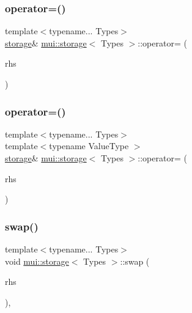\subsubsection{\texorpdfstring{operator=()}{operator=()}\hspace{0.1cm}{\footnotesize\ttfamily [1/2]}}
{\footnotesize\ttfamily template$<$typename... Types$>$ \\
\hyperlink{structmui_1_1storage}{storage}\& \hyperlink{structmui_1_1storage}{mui\+::storage}$<$ Types $>$\+::operator= (\begin{DoxyParamCaption}\item[{\hyperlink{structmui_1_1storage}{storage}$<$ Types $>$}]{rhs }\end{DoxyParamCaption})\hspace{0.3cm}{\ttfamily [inline]}}

\mbox{\label{structmui_1_1storage_a1c9113c4d41c9be4ed22ccd4e0819211}} 
\subsubsection{\texorpdfstring{operator=()}{operator=()}\hspace{0.1cm}{\footnotesize\ttfamily [2/2]}}
{\footnotesize\ttfamily template$<$typename... Types$>$ \\
template$<$typename Value\+Type $>$ \\
\hyperlink{structmui_1_1storage}{storage}\& \hyperlink{structmui_1_1storage}{mui\+::storage}$<$ Types $>$\+::operator= (\begin{DoxyParamCaption}\item[{Value\+Type \&\&}]{rhs }\end{DoxyParamCaption})\hspace{0.3cm}{\ttfamily [inline]}}

\mbox{\label{structmui_1_1storage_a8033776a5221d7de496361d1977673cc}} 
\subsubsection{\texorpdfstring{swap()}{swap()}}
{\footnotesize\ttfamily template$<$typename... Types$>$ \\
void \hyperlink{structmui_1_1storage}{mui\+::storage}$<$ Types $>$\+::swap (\begin{DoxyParamCaption}\item[{\hyperlink{structmui_1_1storage}{storage}$<$ Types $>$ \&}]{rhs }\end{DoxyParamCaption})\hspace{0.3cm}{\ttfamily [inline]}, {\ttfamily [noexcept]}}

